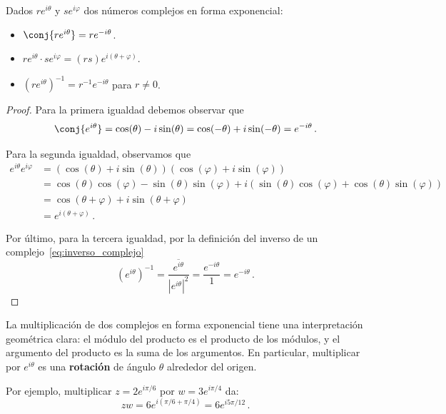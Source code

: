 \begin{prop}
  Dados $re^{i\theta}$ y $se^{i\varphi}$ dos números complejos en forma exponencial:
  \begin{itemize}
    \item $\conj{re^{i\theta}} = re^{-i\theta}$.
    \item $re^{i\theta}\cdot se^{i\varphi} = (rs)e^{i(\theta+\varphi)}$.
    \item $\left(re^{i\theta}\right)^{-1} = r^{-1}e^{-i\theta}$ para $r\neq 0$.
  \end{itemize}
\end{prop}
\begin{proof}
  Para la primera igualdad debemos observar que
  \[
    \conj{e^{i\theta}} = \cos(\theta)-i\sin(\theta) = \cos(-\theta)+i\sin(-\theta) = e^{-i\theta}\,.
  \]

  Para la segunda igualdad, observamos que
  \begin{align*}
    e^{i\theta} e^{i\varphi} & = (\cos(\theta)+i\sin(\theta))(\cos(\varphi)+i\sin(\varphi))                                                 \\
                             & = \cos(\theta)\cos(\varphi)-\sin(\theta)\sin(\varphi)+i(\sin(\theta)\cos(\varphi)+\cos(\theta)\sin(\varphi)) \\
                             & = \cos(\theta+\varphi)+i\sin(\theta+\varphi)                                                                 \\
                             & = e^{i(\theta+\varphi)}\,.
  \end{align*}

  Por último, para la tercera igualdad, por la definición del inverso de un complejo~\eqref{eq:inverso_complejo}
  \[
    \left(e^{i\theta}\right)^{-1} = \frac{\overline{e^{i\theta}}}{|e^{i\theta}|^2} = \frac{e^{-i\theta}}{1} = e^{-i\theta}\,.
  \]
\end{proof}


\begin{eje}
  La multiplicación de dos complejos en forma exponencial tiene una interpretación geométrica clara: el módulo del producto es el producto de los módulos, y el argumento del producto es la suma de los argumentos. En particular, multiplicar por $e^{i\theta}$ es una \textbf{rotación} de ángulo $\theta$ alrededor del origen.

  Por ejemplo, multiplicar $z = 2e^{i\pi/6}$ por $w = 3e^{i\pi/4}$ da:
  \[
    zw = 6e^{i(\pi/6 + \pi/4)} = 6e^{i5\pi/12}\,.
  \]
\end{eje}

